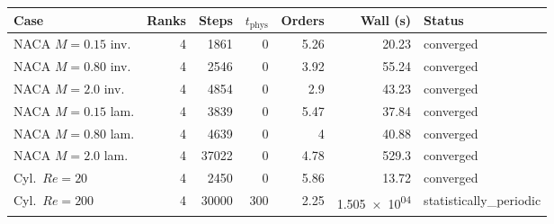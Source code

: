 \begin{tabular}{lrrrrrl}
\toprule
Case & Ranks & Steps & $t_{\mathrm{phys}}$ & Orders & Wall (s) & Status \\
\midrule
NACA $M{=}0.15$ inv. & \num{4} & \num{1861} & \num{0} & \num{5.26} & \num{20.23} & converged \\
NACA $M{=}0.80$ inv. & \num{4} & \num{2546} & \num{0} & \num{3.92} & \num{55.24} & converged \\
NACA $M{=}2.0$ inv. & \num{4} & \num{4854} & \num{0} & \num{2.9} & \num{43.23} & converged \\
NACA $M{=}0.15$ lam. & \num{4} & \num{3839} & \num{0} & \num{5.47} & \num{37.84} & converged \\
NACA $M{=}0.80$ lam. & \num{4} & \num{4639} & \num{0} & \num{4} & \num{40.88} & converged \\
NACA $M{=}2.0$ lam. & \num{4} & \num{37022} & \num{0} & \num{4.78} & \num{529.3} & converged \\
Cyl.\ $Re{=}20$ & \num{4} & \num{2450} & \num{0} & \num{5.86} & \num{13.72} & converged \\
Cyl.\ $Re{=}200$ & \num{4} & \num{30000} & \num{300} & \num{2.25} & \num{1.505e+04} & statistically\_periodic \\
\bottomrule
\end{tabular}

